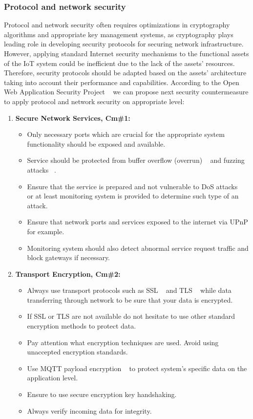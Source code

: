 \documentclass[12pt]{article}
\begin{document}
\subsubsection{Protocol and network security} 
Protocol and network security often requires optimizations in cryptography algorithms and appropriate key management systems, as cryptography plays leading role in developing security protocols for securing network infrastructure. However, applying standard Internet security mechanisms  to the functional assets of the  IoT system could be inefficient due to the lack of the assets' resources. Therefore, security protocols should be adapted based on the assets' architecture taking into account their performance and capabilities. 
According to the Open Web Application Security Project ~\cite{OWASP} we can propose next security countermeasure to apply protocol and network security on appropriate level: 
\begin{enumerate}
\item \textbf{Secure Network Services, Cm\#1:}
		\begin{itemize}
			\item Only necessary ports which are crucial for the appropriate system functionality should be exposed and available.
			\item Service should be protected from buffer overflow (overrun) ~\cite{BufOver} and fuzzing attacks ~\cite{FuzA}.
			\item Ensure that the service is prepared and not vulnerable to DoS attacks ~\cite{DoS} or at least monitoring system is provided to determine such type of an attack.  
			\item Ensure that network ports and services exposed to the internet via UPnP for example.
			\item Monitoring system should also detect abnormal service request traffic and block gateways if necessary. 
		\end{itemize}
		
 \item \textbf{Transport Encryption, Cm\#2:}
		\begin{itemize}
			\item Always use transport protocols such as SSL ~\cite{SSL/TLS} and TLS ~\cite{SSL/TLS} while data transferring through network to be sure that your data is encrypted. 
			\item If SSL or TLS are not available do not hesitate to use other standard encryption methods to protect data. 
			\item Pay attention what encryption techniques are used. Avoid using unaccepted encryption standards.
			\item Use MQTT payload encryption ~\cite{MQTT} to protect system's specific data on the application level.
			\item Ensure to use secure encryption key handshaking.
			\item Always verify incoming data for integrity. 
		\end{itemize}
\end{enumerate}
\end{document}

